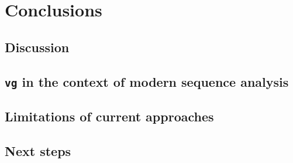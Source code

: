 %
\chapter{Conclusions}

\ifpdf
    \graphicspath{{Chapter3/Figs/Raster/}{Chapter3/Figs/PDF/}{Chapter3/Figs/}}
\else
    \graphicspath{{Chapter3/Figs/Vector/}{Chapter3/Figs/}}
\fi

\section{Discussion}
\section{{\tt vg} in the context of modern sequence analysis}
\section{Limitations of current approaches}
\section{Next steps}
